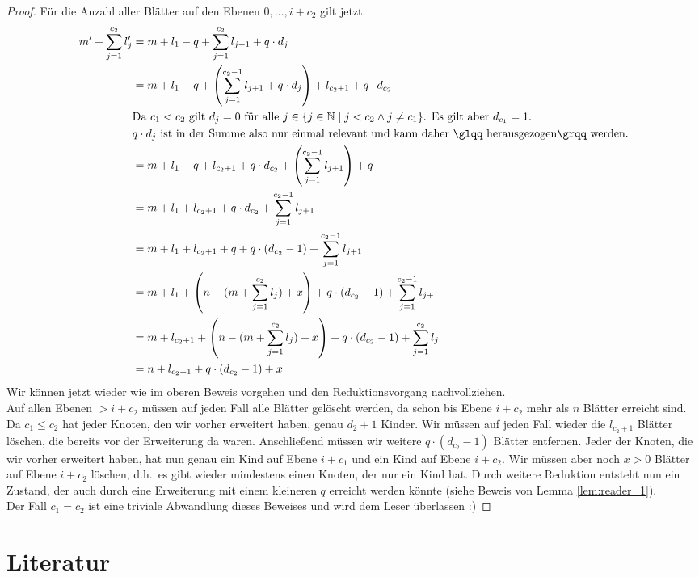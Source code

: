 \documentclass[a4paper,10pt,ngerman]{scrartcl}
\begin{document}
\begin{proof}
        Für die Anzahl aller Blätter auf den Ebenen $0, \dots, i + c_2$ gilt jetzt:
        \begin{equation}
            \begin{aligned}
                m' + \sum^{c_2}_{j=1} l_j' &= m + l_1 - q + \sum^{c_2}_{j=1} l_{j+1} + q \cdot d_j\\
                &= m + l_1 - q + \left(\sum^{c_2-1}_{j=1} l_{j+1} + q \cdot d_j\right) + l_{c_2 + 1} + q \cdot d_{c_2}\\
                &\text{Da $c_1 < c_2$ gilt $d_j = 0$ für alle $j \in \{j \in \mathbb N \mid j < c_2 \land j \neq c_1\}$. Es gilt aber $d_{c_1} = 1$.} \\
                &\text{$q \cdot d_j$ ist in der Summe also nur einmal relevant und kann daher \glqq herausgezogen\grqq~werden.} \\
                &= m + l_1 - q + l_{c_2 + 1} + q \cdot d_{c_2} + \left(\sum^{c_2-1}_{j=1} l_{j+1}\right) + q\\
                &= m + l_1 + l_{c_2 + 1} + q \cdot d_{c_2} + \sum^{c_2-1}_{j=1} l_{j+1}\\
                &=m + l_1 + l_{c_2 + 1} + q + q \cdot (d_{c_2} - 1)  + \sum^{c_2-1}_{j=1} l_{j+1} \\
                &= m + l_1 +  \left(n - (m + \sum^{c_2}_{j=1} l_j) + x\right) + q \cdot (d_{c_2} - 1) + \sum^{c_2-1}_{j=1} l_{j+1} \\
                &= m + l_{c_2 + 1} +  \left(n - (m + \sum^{c_2}_{j=1} l_j) + x\right) + q \cdot (d_{c_2} - 1) + \sum^{c_2}_{j=1} l_{j} \\
                &= n + l_{c_2 + 1} + q \cdot (d_{c_2} - 1) + x\\
            \end{aligned}\label{eq:equation2}
        \end{equation}
        Wir können jetzt wieder wie im oberen Beweis vorgehen und den Reduktionsvorgang nachvollziehen. \\
        Auf allen Ebenen $> i + c_2$ müssen auf jeden Fall alle Blätter gelöscht werden, da schon bis Ebene $i + c_2$ mehr als $n$ Blätter erreicht sind.
        Da $c_1 \le c_2$ hat jeder Knoten, den wir vorher erweitert haben, genau $d_2 + 1$ Kinder.
        Wir müssen auf jeden Fall wieder die $l_{c_2 + 1}$ Blätter löschen, die bereits vor der Erweiterung da waren.
        Anschließend müssen wir weitere $q \cdot (d_{c_2} - 1)$ Blätter entfernen.
        Jeder der Knoten, die wir vorher erweitert haben, hat nun genau ein Kind auf Ebene $i + c_1$ und ein Kind auf Ebene $i + c_2$.
        Wir müssen aber noch $x > 0$ Blätter auf Ebene $i + c_2$ löschen, d.h.\ es gibt wieder mindestens einen Knoten, der nur ein Kind hat.
        Durch weitere Reduktion entsteht nun ein Zustand, der auch durch eine Erweiterung mit einem kleineren $q$ erreicht werden könnte (siehe Beweis von Lemma \ref{lem:reader_1}). \\
        Der Fall $c_1 = c_2$ ist eine triviale Abwandlung dieses Beweises und wird dem Leser überlassen :)
    \end{proof}


    \section{Literatur}
    \printbibliography[heading=none]
\end{document}
